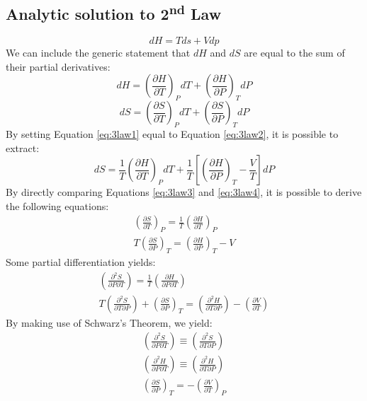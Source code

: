 \documentclass[10pt, oneside, twocolumn]{article}
\numberwithin{equation}{section}
\begin{document}
		\subsection{Analytic solution to 2\textsuperscript{nd} Law}
			\begin{equation}
			{d}H=T{d}s+V{d}p \label{eq:3law1}
			\end{equation}
			We can include the generic statement that $dH$ and $dS$ are equal to the sum of their partial derivatives:
			\begin{equation}
			dH={\left(\frac{\partial H}{\partial T}\right)}_P{d}T+{\left(\frac{\partial H}{\partial P}\right)}_T{d}P \label{eq:3law2}
			\end{equation}
			\begin{equation}
			dS={\left(\frac{\partial S}{\partial T}\right)}_P{d}T+{\left(\frac{\partial S}{\partial P}\right)}_T{d}P \label{eq:3law3}
			\end{equation}
			By setting Equation \ref{eq:3law1} equal to Equation \ref{eq:3law2}, it is possible to extract:
			\begin{equation}
			dS=\frac{1}{T}{\left(\frac{\partial H}{\partial T}\right)}_P{d}T+\frac{1}{T}\left[{\left(\frac{\partial H}{\partial P}\right)}_T-\frac{V}{T}\right]dP \label{eq:3law4}
			\end{equation}
			By directly comparing Equations \ref{eq:3law3} and \ref{eq:3law4}, it is possible to derive the following equations:
			\begin{gather}
			{\left(\frac{\partial S}{\partial T}\right)}_P=\frac{1}{T}{\left(\frac{\partial H}{\partial T}\right)}_P \label{eq:3law10}\\
			T{\left(\frac{\partial S}{\partial P}\right)}_T={\left(\frac{\partial H}{\partial P}\right)}_T-V \label{eq:3law5}
			\end{gather}
			Some partial differentiation yields:
			\begin{gather}
			{\left(\frac{\partial^2 S}{\partial P\partial T}\right)}=\frac{1}{T}{\left(\frac{\partial H}{\partial P\partial T}\right)}\\
			T{\left(\frac{\partial^2 S}{\partial T\partial P}\right)}+{\left(\frac{\partial S}{\partial P}\right)}_T={\left(\frac{\partial^2 H}{\partial T\partial P}\right)}-{\left(\frac{\partial V}{\partial T}\right)}
			\end{gather}
			By making use of Schwarz's Theorem, we yield:
			\begin{gather}
			{\left(\frac{\partial^2 S}{\partial P\partial T}\right)}\equiv{\left(\frac{\partial^2 S}{\partial T\partial P}\right)}\\
			{\left(\frac{\partial^2 H}{\partial P\partial T}\right)}\equiv{\left(\frac{\partial^2 H}{\partial T\partial P}\right)}\\
			{\left(\frac{\partial S}{\partial P}\right)}_T=-{\left(\frac{\partial V}{\partial T}\right)}_P \label{eq:3law6}\\
			\end{gather}
\end{document}
